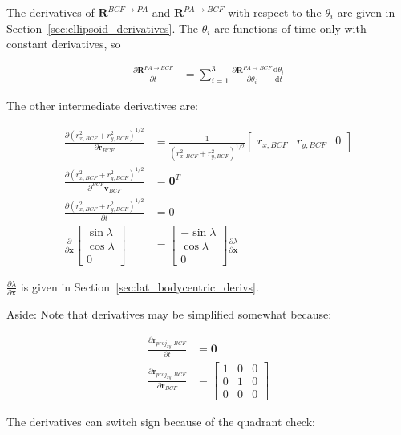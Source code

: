 \documentclass[]{article}
\newcommand{\vb}[1]{\bm{#1}} %
\newcommand{\ddt}[1]{\frac{\mathrm{d} #1}{\mathrm{d} t}} %
\newcommand{\pd}[2]{\frac{\partial #1}{\partial #2}} %
\begin{document}
The derivatives of $\vb{R}^{BCF \rightarrow PA}$ and $\vb{R}^{PA \rightarrow BCF}$ with respect to the $\theta_i$ are given in Section~\ref{sec:ellipsoid_derivatives}. The $\theta_i$ are functions of time only with constant derivatives, so

\begin{align}
	\pd{\vb{R}^{PA \rightarrow BCF}}{t} &= \sum_{i=1}^3 \pd{\vb{R}^{PA \rightarrow BCF}}{\theta_i} \ddt{\theta_i}
\end{align}

The other intermediate derivatives are:

\begin{align}
	\pd{\left( r_{x, BCF}^2 + r_{y, BCF}^2 \right)^{1/2}}{\vb{r}_{BCF}} &= \frac{1}{\left( r_{x, BCF}^2 + r_{y, BCF}^2 \right)^{1/2}} \left[ \begin{array}{ccc} r_{x, BCF} & r_{y, BCF} & 0 \end{array} \right] \\
	\pd{\left( r_{x, BCF}^2 + r_{y, BCF}^2 \right)^{1/2}}{^{BCF} \vb{v}_{BCF}} &= \vb{0}^T \\
	\pd{\left( r_{x, BCF}^2 + r_{y, BCF}^2 \right)^{1/2}}{t} &= 0 \\
	\pd{}{\vb{x}} \left[ \begin{array}{c} \sin \lambda \\ \cos \lambda \\ 0 \end{array} \right] &= \left[ \begin{array}{c} -\sin \lambda \\ \cos \lambda \\ 0 \end{array} \right] \pd{\lambda}{\vb{x}}
\end{align}

$\pd{\lambda}{\vb{x}}$ is given in Section~\ref{sec:lat_bodycentric_derivs}.

Aside: Note that derivatives may be simplified somewhat because:

\begin{align}
	\pd{\vb{r}_{proj_{xy}, BCF}}{t} &= \vb{0} \\
	\pd{\vb{r}_{proj_{xy}, BCF}}{\vb{r}_{BCF}} &= \left[ \begin{array}{ccc} 1 & 0 & 0 \\ 0 & 1 & 0 \\ 0 & 0 & 0 \end{array} \right]
\end{align}

The derivatives can switch sign because of the quadrant check:
\end{document}
